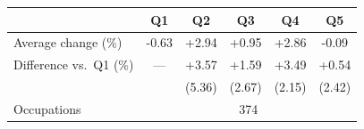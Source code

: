 \begin{tabular}{lccccc}
\toprule
 & Q1 & Q2 & Q3 & Q4 & Q5 \\
\midrule
Average change (\%) & -0.63 & +2.94 & +0.95 & +2.86 & -0.09 \\
\addlinespace
Difference vs.\ Q1 (\%) & --- & +3.57 & +1.59 & +3.49 & +0.54 \\
 &  & (5.36) & (2.67) & (2.15) & (2.42) \\
\midrule
Occupations & \multicolumn{5}{c}{374} \\
\bottomrule
\end{tabular}
